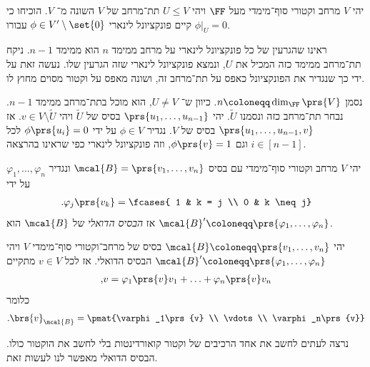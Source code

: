 \documentclass[a4paper,10pt,twoside,openany]{book}
\begin{document}
\begin{exercisechap}
יהי
$V$
מרחב וקטורי סוף־מימדי מעל
$\FF$
ויהי
$U \leq V$
תת־מרחב של
$V$
השונה מ־%
$V$.
הוכיחו כי קיים פונקציונל לינארי
$\phi \in V' \setminus \set{0}$
עבורו
$\left. \phi \right|_U = 0$.
\end{exercisechap}

\begin{solution}
ראינו שהגרעין של כל פונקציונל לינארי על מרחב ממימד
$n$
הוא ממימד
$n-1$.
ניקח תת־מרחב ממימד כזה המכיל את
$U$,
ונמצא פונקציונל לינארי שזה הגרעין שלו. נעשה זאת על ידי כך שנגדיר את הפונקציונל כאפס על תת־מרחב זה, ושונה מאפס על וקטור מסוים מחוץ לו.

נסמן
$n \coloneqq \dim_\FF\prs{V}$.
כיוון ש־%
$U \neq V$,
הוא מוכל בתת־מרחב ממימד
$n-1$.
נבחר תת־מרחב כזה ונסמנו
$\tilde{U}$.
יהי
$\prs{u_1, \ldots, u_{n-1}}$
בסיס של
$\tilde{U}$
ויהי
$v \in V \setminus \tilde{U}$.
אז
$\prs{u_1, \ldots, u_{n-1}, v}$
בסיס של
$V$.
נגדיר
$\phi \in V$
על ידי
$\phi\prs{u_i} = 0$
לכל
$i \in [n-1]$
וגם
$\phi\prs{v} = 1$,
וזה פונקציונל לינארי כפי שראינו בהרצאה.
\end{solution}

\begin{definition}
יהי
$V$
מרחב וקטורי סוף־מימדי עם בסיס
$\mcal{B} = \prs{v_1, \ldots, v_n}$
ונגדיר
$\varphi_1, \ldots, \varphi_n$
על ידי
\begin{align*}
\text{.} \varphi_j\prs{v_k} = \fcases{ 1 & k = j \\ 0 & k \neq j}
\end{align*}
אז
\emph{הבסיס הדואלי}
של
$\mcal{B}$
הוא
$\mcal{B}' \coloneqq \prs{\varphi_1, \ldots, \varphi_n}$.
\end{definition}

\begin{proposition}
יהי
$\mcal{B} \coloneqq \prs{v_1, \ldots, v_n}$
בסיס של מרחב־וקטורי סוף־מימדי
$V$
ויהי
$\mcal{B}' \coloneqq \prs{\varphi_1, \ldots, \varphi_n}$
הבסיס הדואלי. אז לכל
$v \in V$
מתקיים
\begin{align*}
\text{,} v = \varphi_1\prs{v} v_1 + \ldots + \varphi_n\prs{v} v_n
\end{align*}
כלומר
\begin{align*}
\text{.} \brs{v}_{\mcal{B}} = \pmat{\varphi_1\prs{v} \\ \vdots \\ \varphi_n\prs{v}}
\end{align*}
\end{proposition}

נרצה לעתים לחשב את אחד הרכיבים של וקטור קואורדינטות בלי לחשב את הוקטור כולו. הבסיס הדואלי מאפשר לנו לעשות זאת.
\end{document}
